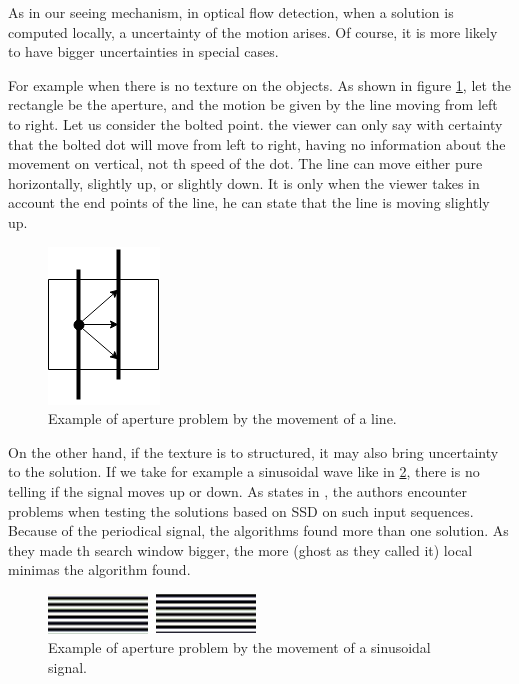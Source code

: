 \documentclass[12pt,a4paper,twoside]{report}
\begin{document}
 
As in our seeing mechanism, in optical flow detection, when a solution is computed locally, a uncertainty of the motion arises. Of course, it is more likely to have bigger uncertainties in special cases. 

For example when there is no texture on the objects. As shown in figure \ref{apertureimg}, let the rectangle be the aperture, and the motion be given by the line moving from left to right. Let us consider the bolted point. the viewer can only say with certainty that the bolted dot will move from left to right, having no information about the movement on vertical, not th speed of the dot. The line can move either pure horizontally, slightly up, or slightly down. It is only when the viewer takes in account the end points of the line, he can state that the line is moving slightly up.  

\begin{figure}
	\label{apertureimg}
	\centering
	\includegraphics{img/Aperture}
	\caption{Example of aperture problem by the movement of a line.}
\end{figure}

On the other hand, if the texture is to structured, it may also bring uncertainty to the solution. If we take for example a sinusoidal wave like in \ref{apertureimgSin}, there is no telling if the signal moves up or down. As states in \cite{barron1994}, the authors encounter problems when testing the solutions based on SSD on such input sequences. Because of the periodical signal, the algorithms found more than one solution. As they made th search window bigger, the more (ghost as they called it) local minimas the algorithm found. 

\begin{figure}
	\label{apertureimgSin}
	\centering
	\includegraphics{img/sin}
	\caption{Example of aperture problem by the movement of a sinusoidal signal.}
\end{figure}
\end{document}
